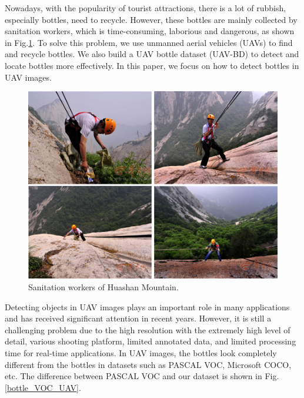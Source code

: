 \label{sec:intro}


Nowadays, with the popularity of tourist attractions, there is a lot of rubbish, especially bottles, need to recycle. However, these bottles are mainly collected by sanitation workers, which is time-consuming, laborious and dangerous, as shown in Fig.\ref{fig:sanitation_worker}. To solve this problem, we use unmanned aerial vehicles (UAVs) to find and recycle bottles. We also build a UAV bottle dataset (UAV-BD) to detect and locate bottles more effectively. In this paper, we focus on how to detect bottles in UAV images.


\begin{figure}
	\includegraphics[width=\linewidth]{images/sanitation_worker.png}
	\caption{Sanitation workers of Huashan Mountain\protect\footnotemark.}
	\label{fig:sanitation_worker}
\end{figure}





Detecting objects in UAV images plays an important role in many applications and has received significant attention in recent years\cite{UAV2}. However, it is still a challenging problem due to the high resolution with the extremely high level of detail, various shooting platform, limited annotated data, and limited processing time for real-time applications\cite{car_detection}. In UAV images, the bottles look completely different from the bottles in datasets such as PASCAL VOC\cite{PASCALVOC}, Microsoft COCO\cite{COCO}, etc. The difference between PASCAL VOC and our dataset is shown in Fig.\ref{bottle_VOC_UAV}.

